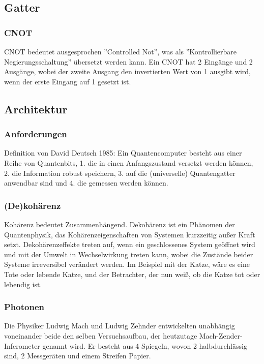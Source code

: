 \subsection{Gatter}
\label{sec:Gatter}

\subsubsection{CNOT}

CNOT bedeutet ausgesprochen ''Controlled Not'', was als ''Kontrollierbare Negierungsschaltung'' übersetzt werden kann.
Ein CNOT hat 2 Eingänge und 2 Ausgänge, wobei der zweite Ausgang den invertierten Wert von 1 ausgibt wird, wenn der erste Eingang auf 1 gesetzt ist.

\subsection{Architektur}
\label{sec:Architektur}

\subsubsection{Anforderungen}

Definition von David Deutsch 1985:
Ein Quantencomputer besteht aus einer Reihe von Quantenbits,
1. die in einen Anfangszustand versetzt werden können,
2. die Information robust speichern,
3. auf die (universelle) Quantengatter anwendbar sind und
4. die gemessen werden können.

\subsubsection{(De)kohärenz}

Kohärenz bedeutet Zusammenhängend. Dekohärenz ist ein Phänomen der Quantenphysik, das Kohärenzeigenschaften von Systemen kurzzeitig außer Kraft setzt. Dekohärenzeffekte treten auf, wenn ein geschlossenes System geöffnet wird und mit der Umwelt in Wechselwirkung treten kann, wobei die Zustände beider Systeme irreversibel verändert werden.
Im Beispiel mit der Katze, wäre es eine Tote oder lebende Katze, und der Betrachter, der nun weiß, ob die Katze tot oder lebendig ist.

\subsubsection{Photonen}

Die Physiker Ludwig Mach und Ludwig Zehnder entwickelten unabhängig voneinander beide den selben Versuchsaufbau, der heutzutage Mach-Zender-Inferometer genannt wird. Er besteht aus 4 Spiegeln, wovon 2 halbdurchlässig sind, 2 Messgeräten und einem Streifen Papier.

